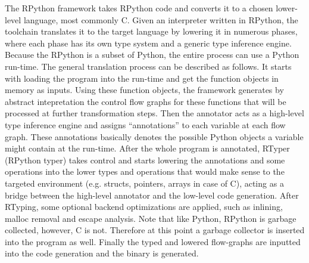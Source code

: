 
The RPython framework takes RPython code and converts it to a chosen
lower-level language, most commonly C. Given an interpreter written in
RPython, the toolchain translates it to the target language by
lowering it in numerous phases, where each phase has its own type
system and a generic type inference engine. Because the RPython is a
subset of Python, the entire process can use a Python run-time. The
general translation process can be described as follows. It starts
with loading the program into the run-time and get the function
objects in memory as inputs. Using these function objects, the
framework generates by abstract intepretation the control flow graphs
for these functions that will be processed at further transformation
steps. Then the annotator acts as a high-level type inference engine
and assigns ``annotations'' to each variable at each flow graph. These
annotations basically denotes the possible Python objects a variable
might contain at the run-time. After the whole program is annotated,
RTyper (RPython typer) takes control and starts lowering the
annotations and some operations into the lower types and operations
that would make sense to the targeted environment (e.g. structs,
pointers, arrays in case of C), acting as a bridge between the
high-level annotator and the low-level code generation. After RTyping,
some optional backend optimizations are applied, such as inlining,
malloc removal and escape analysis. Note that like Python, RPython is
garbage collected, however, C is not. Therefore at this point a
garbage collector is inserted into the program as well. Finally the
typed and lowered flow-graphs are inputted into the code generation
and the binary is generated. \cite{rpython07, pypy06, pypy08}

\vspace{-0.25cm}
